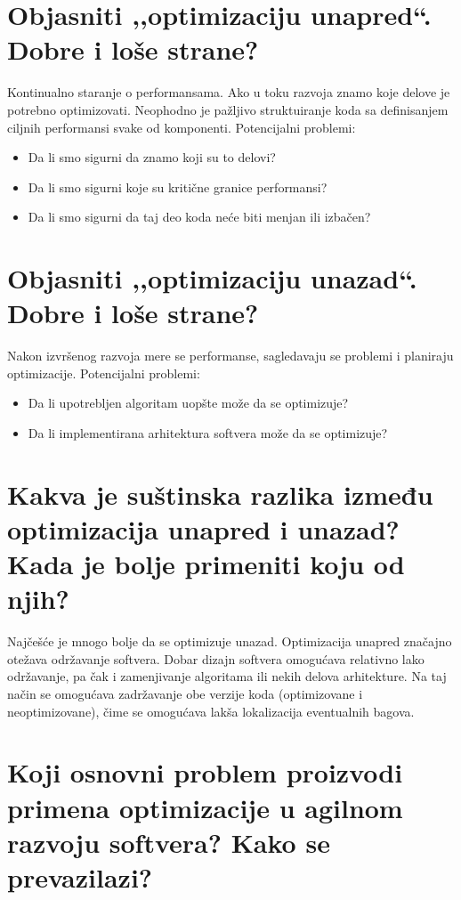 \documentclass[a4paper]{article}
\begin{document}
\section{Objasniti ,,optimizaciju unapred``. Dobre i loše strane?}
  Kontinualno staranje o performansama. Ako u toku razvoja znamo koje delove je potrebno optimizovati.
  Neophodno je pažljivo struktuiranje koda sa definisanjem ciljnih performansi svake od komponenti.
  Potencijalni problemi:
  \begin{itemize}
    \item Da li smo sigurni da znamo koji su to delovi?
    \item Da li smo sigurni koje su kritične granice performansi?
    \item Da li smo sigurni da taj deo koda neće biti menjan ili izbačen?
  \end{itemize}
\section{Objasniti ,,optimizaciju unazad``. Dobre i loše strane?}
  Nakon izvršenog razvoja mere se performanse, sagledavaju se problemi i planiraju optimizacije.
  Potencijalni problemi:
  \begin{itemize}
    \item Da li upotrebljen algoritam uopšte može da se optimizuje?
    \item Da li implementirana arhitektura softvera može da se optimizuje?
  \end{itemize}
\section{Kakva je suštinska razlika između optimizacija unapred i unazad? 
         Kada je bolje primeniti koju od njih?}
  Najčešće je mnogo bolje da se optimizuje unazad.
  Optimizacija unapred značajno otežava održavanje softvera.
  Dobar dizajn softvera omogućava relativno lako održavanje, pa čak i zamenjivanje algoritama ili 
  nekih delova arhitekture. Na taj način se omogućava zadržavanje obe verzije koda (optimizovane i 
  neoptimizovane), čime se omogućava lakša lokalizacija eventualnih bagova.

\section{Koji osnovni problem proizvodi primena optimizacije u agilnom razvoju softvera? 
         Kako se prevazilazi?}
  
\end{document}
